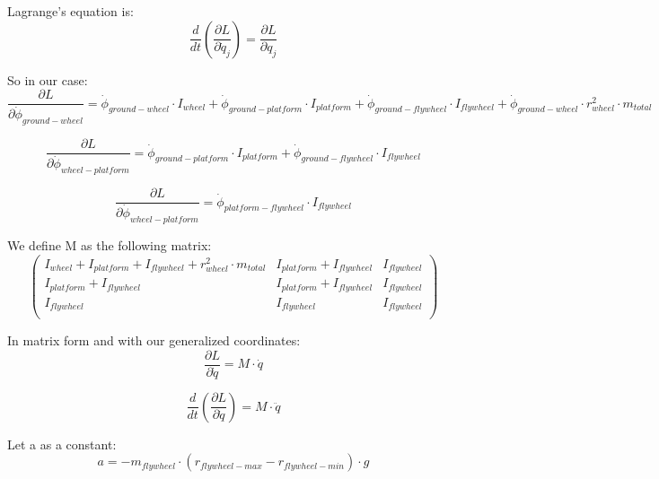 Lagrange's equation is:
\begin{equation}
	\frac{d}{dt}(\frac{\partial L}{\partial \dot{q}_j})=
	\frac{\partial L}{\partial q_j}	
\end{equation}

So in our case:
\begin{equation}
	\frac{\partial L}{\partial \dot{\phi}_{ground-wheel}}=
	\dot{\phi}_{ground-wheel} \cdot I_{wheel}
	+ \dot{\phi}_{ground-platform} \cdot I_{platform}
	+ \dot{\phi}_{ground-flywheel}\cdot I_{flywheel}
	+ \dot{\phi}_{ground-wheel}\cdot r_{wheel}^2\cdot m_{total}
\end{equation}

\begin{equation}
	\frac{\partial L}{\partial \dot{\phi}_{wheel-platform}}=
	\dot{\phi}_{ground-platform} \cdot I_{platform}
	+ \dot{\phi}_{ground-flywheel}\cdot I_{flywheel}
\end{equation}

\begin{equation}
	\frac{\partial L}{\partial \dot{\phi}_{wheel-platform}}=
	\dot{\phi}_{platform-flywheel}\cdot I_{flywheel}
\end{equation}

We define M as the following matrix:
\begin{equation}
	\begin{pmatrix} 
		I_{wheel} + I_{platform} + I_{flywheel} + r_{wheel}^2 \cdot m_{total} &
		I_{platform} + I_{flywheel} &
		I_{flywheel}\\
		I_{platform} + I_{flywheel} &
		I_{platform} + I_{flywheel} &
		I_{flywheel}\\
		I_{flywheel} &
		I_{flywheel} &
		I_{flywheel}\\
		\end{pmatrix}
\end{equation}

In matrix form and with our generalized coordinates:
\begin{equation}
	\frac{\partial L}{\partial \dot{q}} =
	M \cdot \dot{q}
\end{equation}

\begin{equation}
	\frac{d}{dt}(\frac{\partial L}{\partial \dot{q}}) = 	M \cdot \ddot{q}	
\end{equation}

Let a as a constant:
\begin{equation}
	a = - m_{flywheel}\cdot (r_{flywheel-max}-r_{flywheel-min}) \cdot g	
\end{equation}


